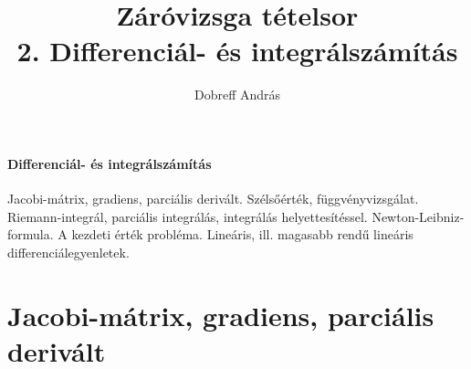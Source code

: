 \documentclass[margin=0px]{article}
\title{Záróvizsga tételsor \\ \large 2. Differenciál- és integrálszámítás}
\date{}
\author{Dobreff András}
\newenvironment{tetel}[1]{\paragraph{#1 \\}}{}
\begin{document}
	\maketitle
	
	\begin{tetel}{Differenciál- és integrálszámítás}
			Jacobi-mátrix, gradiens, parciális derivált. Szélsőérték, függvényvizsgálat. Riemann-integrál, parciális integrálás, integrálás helyettesítéssel. Newton-Leibniz-formula. A kezdeti érték probléma. Lineáris, ill. magasabb rendű lineáris differenciálegyenletek.
	\end{tetel}
	
	\section{Jacobi-mátrix, gradiens, parciális derivált}
\end{document}
